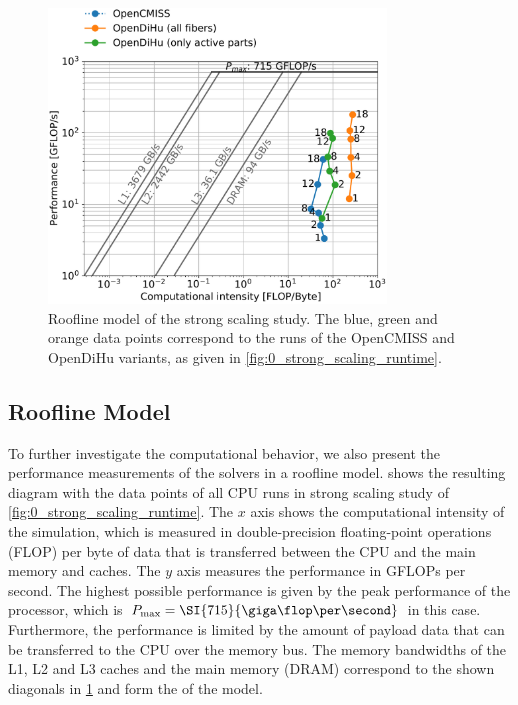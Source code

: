 \begin{figure}[H]
  \centering%
  \includegraphics[width=0.8\textwidth]{images/results/studies/0_roofline.pdf}%
  \caption{Roofline model of the strong scaling study. The blue, green and orange data points correspond to the runs of the OpenCMISS and OpenDiHu variants, as given in \cref{fig:0_strong_scaling_runtime}.}%
  \label{fig:0_roofline}%
\end{figure}%

\subsection{Roofline Model}\label{sec:roofline_model}
To further investigate the computational behavior, we also present the performance measurements of the solvers in a roofline model. 
 shows the resulting diagram with the data points of all CPU runs in strong scaling study of \cref{fig:0_strong_scaling_runtime}. The $x$ axis shows the computational intensity of the simulation, which is measured in double-precision floating-point operations (FLOP) per byte of data that is transferred between the CPU and the main memory and caches. The $y$ axis measures the performance in GFLOPs per second. The highest possible performance is given by the peak performance of the processor, which is $P_\text{max} = \SI{715}{\giga\flop\per\second}$ in this case. Furthermore, the performance is limited by the amount of payload data that can be transferred to the CPU over the memory bus. The memory bandwidths of the L1, L2 and L3 caches and the main memory (DRAM) correspond to the shown diagonals in \cref{fig:0_roofline} and form the  of the model.


